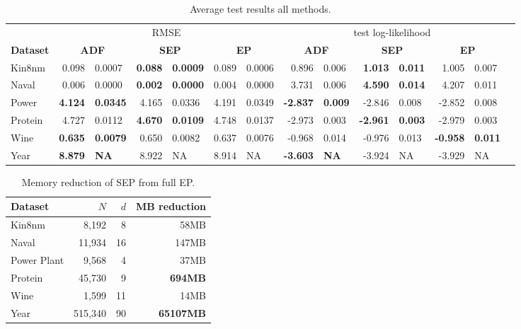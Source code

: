 \begin{table} 
\small
\centering \label{tab:results} \begin{tabular}{l@{\ica}r@{$\pm$}l@{\ica}r@{$\pm$}l@{\ica}r@{$\pm$}l@{\ica}r@{$\pm$}l@{\ica}r@{$\pm$}l@{\ica}r@{$\pm$}l@{\ica}r@{$\pm$}}\hline 
{} & \multicolumn{6}{c}{RMSE} & \multicolumn{6}{c}{test log-likelihood} \\
\bf{Dataset}&\multicolumn{2}{c}{\bf{ ADF }}&\multicolumn{2}{c}{\bf{ SEP }}&\multicolumn{2}{c}{\bf{ EP }} &\multicolumn{2}{c}{\bf{ ADF }}&\multicolumn{2}{c}{\bf{ SEP }}&\multicolumn{2}{c}{\bf{ EP }} \\ \hline 
%
Kin8nm&0.098&0.0007&\bf{0.088}&\bf{0.0009}&0.089&0.0006
	&0.896&0.006&\bf{1.013}&\bf{0.011}&1.005&0.007\\ 
%
Naval&0.006&0.0000&\bf{0.002}&\bf{0.0000}&0.004&0.0000
	&3.731&0.006&\bf{4.590}&\bf{0.014}&4.207&0.011\\  
%
Power&\bf{4.124}&\bf{0.0345}&4.165&0.0336&4.191&0.0349
	&\bf{-2.837}&\bf{0.009}&-2.846&0.008&-2.852&0.008\\
% 
Protein&4.727&0.0112&\bf{4.670}&\bf{0.0109}&4.748&0.0137
	&-2.973&0.003&\bf{-2.961}&\bf{0.003}&-2.979&0.003\\ 
%
Wine&\bf{0.635}&\bf{0.0079}&0.650&0.0082&0.637&0.0076
	&-0.968&0.014&-0.976&0.013&\bf{-0.958}&\bf{0.011}\\  
%
Year&\bf{8.879}&\bf{   NA}&8.922&   NA&8.914&   NA
&\bf{-3.603}&\bf{  NA}&-3.924&  NA&-3.929&  NA\\
 \hline \end{tabular} 
\caption{ Average test results all methods. } 
 \end{table} 


\begin{table} 
\small
\centering 
\begin{tabular}{lrrr}\hline \bf{Dataset}& $N$ & $d$ & MB reduction\\ \hline 
Kin8nm & 8,192 & 8 & 58MB \\ 
Naval & 11,934 & 16 & 147MB\\ 
Power Plant & 9,568 & 4 & 37MB\\ 
Protein & 45,730 & 9 & \bf{694MB}\\ 
Wine & 1,599 & 11 & 14MB\\ 
Year & 515,340 & 90 & \bf{65107MB}\\ \hline 
\end{tabular} 
\caption{ Memory reduction of SEP from full EP. } \label{tab:memory} 
\end{table} 
%


